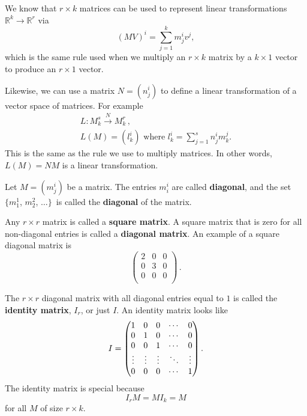 We know that $r\times k$ matrices can be used to represent linear transformations 
$ \mathbb{R}^k \rightarrow \mathbb{R}^r $
via \[(MV)^i = \sum_{j=1}^{k} m_j^iv^j , \] which is the same rule used when we multiply an $r\times k$ matrix by a $k\times 1$ vector to produce an $r\times1$ vector.

Likewise, we can use a matrix $N=(n^i_j)$ to define a linear transformation of a vector space of matrices. For example
\begin{gather*}
L \colon M^s_k \stackrel{N}{\longrightarrow} M^r_k\, ,\\
L(M)=(l^i_k) \mbox{ where } l^i_k= \sum_{j=1}^{s} n_j^im^j_k.
\end{gather*}
This is the same as the rule we use to multiply matrices. \hypertarget{leftmult}{In other words,} \(L(M)=NM\) is a linear transformation.

\begin{definition}  
Let $M=(m^i_j)$ be a matrix. The entries $m_i^i$ are called {\bfseries diagonal}, and the set $\{m_1^1$, $m_2^2$, $\ldots \}$~is called the {\bfseries diagonal} of the matrix.

Any $r\times r$ matrix is called a {\bfseries square matrix}.  A square matrix that is zero for all non-diagonal entries is called a {\bfseries diagonal matrix}. An example of a square diagonal matrix is
\[\begin{pmatrix}
2 & 0 & 0\\
0 & 3 & 0\\
0 & 0 & 0\\
\end{pmatrix}\, .\]

The $r\times r$ diagonal matrix with all diagonal entries equal to $1$ is called the {\bfseries identity matrix}, $I_r$, or just $I$.  An identity matrix looks like \[ I=
\begin{pmatrix}
1 & 0 & 0 & \cdots & 0 \\
0 & 1 & 0 & \cdots & 0 \\
0 & 0 & 1 & \cdots & 0 \\
\multicolumn{1}{c}{\vdots} & \multicolumn{1}{c}{\vdots} & \multicolumn{1}{c}{\vdots} & \ddots & \multicolumn{1}{c}{\vdots} \\
0 & 0 & 0 & \cdots & 1
\end{pmatrix}.
\]
The identity matrix is special because \[I_rM=MI_k=M\] for all $M$ of size $r\times k$.
\end{definition}



